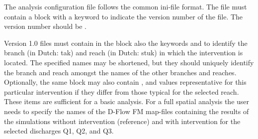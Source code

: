 The analysis configuration file follows the common ini-file format.
The file must contain a \keyw{[General]} block with a keyword  to indicate the version number of the file.
The version number should be .

Version 1.0 files must contain in the \keyw{[General]} block also the keywords  and  to identify the branch (in Dutch: tak) and reach (in Dutch: stuk) in which the intervention is located.
The specified names may be shortened, but they should uniquely identify the branch and reach amongst the names of the other branches and reaches.
Optionally, the same block may also contain ,  and  values representative for this particular intervention if they differ from those typical for the selected reach.
These items are sufficient for a basic analysis.
For a full spatial analysis the user needs to specify the names of the D-Flow FM map-files containing the results of the simulations without intervention (reference) and with intervention for the selected discharges Q1, Q2, and Q3.

